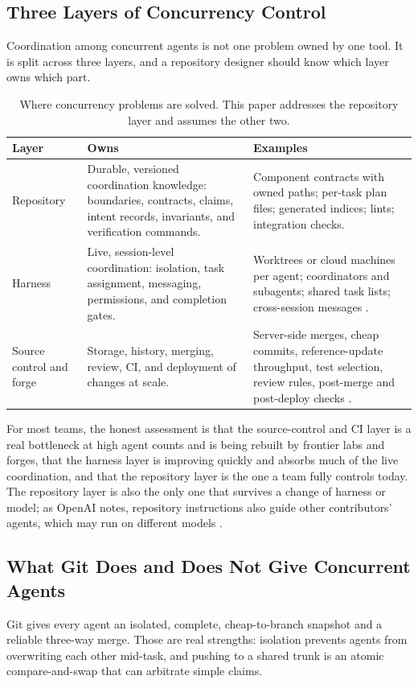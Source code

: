 \documentclass[11pt]{article}
\begin{document}
\subsection{Three Layers of Concurrency Control}
Coordination among concurrent agents is not one problem owned by one tool. It is split across three layers, and a repository designer should know which layer owns which part.

\begin{table}[h]
\centering
\small
\begin{tabularx}{\textwidth}{l L L}
\toprule
Layer & Owns & Examples \\
\midrule
Repository & Durable, versioned coordination knowledge: boundaries, contracts, claims, intent records, invariants, and verification commands. & Component contracts with owned paths; per-task plan files; generated indices; lints; integration checks. \\
Harness & Live, session-level coordination: isolation, task assignment, messaging, permissions, and completion gates. & Worktrees or cloud machines per agent; coordinators and subagents; shared task lists; cross-session messages \cite{osmani2026cloud,anthropic2026crosssession,cursor2026projects,openai2026agentsapi}. \\
Source control and forge & Storage, history, merging, review, CI, and deployment of changes at scale. & Server-side merges, cheap commits, reference-update throughput, test selection, review rules, post-merge and post-deploy checks \cite{anthropic2026scion,celenza2026gitinfra,malhotra2026ci,lalkaka2026rollouts}. \\
\bottomrule
\end{tabularx}
\caption{Where concurrency problems are solved. This paper addresses the repository layer and assumes the other two.}
\end{table}

For most teams, the honest assessment is that the source-control and CI layer is a real bottleneck at high agent counts and is being rebuilt by frontier labs and forges, that the harness layer is improving quickly and absorbs much of the live coordination, and that the repository layer is the one a team fully controls today. The repository layer is also the only one that survives a change of harness or model; as OpenAI notes, repository instructions also guide other contributors' agents, which may run on different models \cite{provencher2026astra}.

\subsection{What Git Does and Does Not Give Concurrent Agents}
Git gives every agent an isolated, complete, cheap-to-branch snapshot and a reliable three-way merge. Those are real strengths: isolation prevents agents from overwriting each other mid-task, and pushing to a shared trunk is an atomic compare-and-swap that can arbitrate simple claims.
\end{document}
